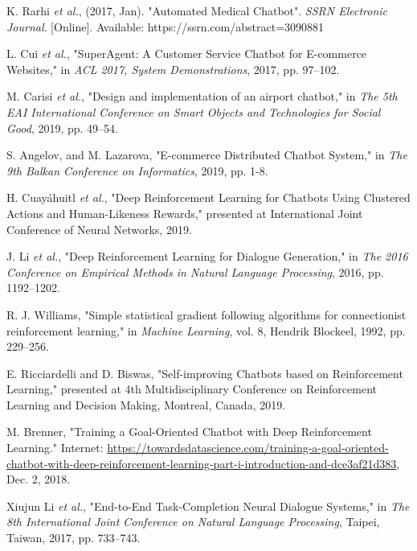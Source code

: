 \cleardoublepage
{}
\begin{thebibliography}{99}

K. Rarhi \textit{et al.}, (2017, Jan). "Automated Medical Chatbot". \textit{SSRN Electronic Journal}. [Online]. Available: https://ssrn.com/abstract=3090881

L. Cui \textit{et al.}, "SuperAgent: A Customer Service Chatbot for E-commerce Websites," in \textit{ACL 2017, System Demonstrations}, 2017, pp. 97–102.

M. Carisi \textit{et al.}, "Design and implementation of an airport chatbot," in \textit{The 5th EAI International Conference on Smart Objects and Technologies for Social Good}, 2019, pp. 49–54.

S. Angelov, and M. Lazarova, "E-commerce Distributed Chatbot System," in \textit{The 9th Balkan Conference on Informatics}, 2019, pp. 1-8.

H. Cuayáhuitl \textit{et al.}, "Deep Reinforcement Learning for Chatbots Using Clustered Actions and Human-Likeness Rewards," presented at International Joint Conference of Neural Networks, 2019.

J. Li \textit{et al.}, "Deep Reinforcement Learning for Dialogue Generation," in \textit{The 2016 Conference on Empirical Methods in Natural Language Processing}, 2016, pp. 1192–1202.

R. J. Williams, "Simple statistical gradient following algorithms for connectionist reinforcement learning," in \textit{Machine Learning}, vol. 8, Hendrik Blockeel, 1992, pp. 229–256.

E. Ricciardelli and D. Biswas, "Self-improving Chatbots based on Reinforcement Learning," presented at 4th Multidisciplinary Conference on Reinforcement Learning and Decision Making, Montreal, Canada, 2019.

M. Brenner, "Training a Goal-Oriented Chatbot with Deep Reinforcement Learning." Internet: \url{https://towardsdatascience.com/training-a-goal-oriented-chatbot-with-deep-reinforcement-learning-part-i-introduction-and-dce3af21d383}, Dec. 2, 2018.

Xiujun Li \textit{et al.}, "End-to-End Task-Completion Neural Dialogue Systems," in \textit{The 8th International Joint Conference on Natural Language Processing}, Taipei, Taiwan, 2017, pp. 733–743.


\end{thebibliography}

